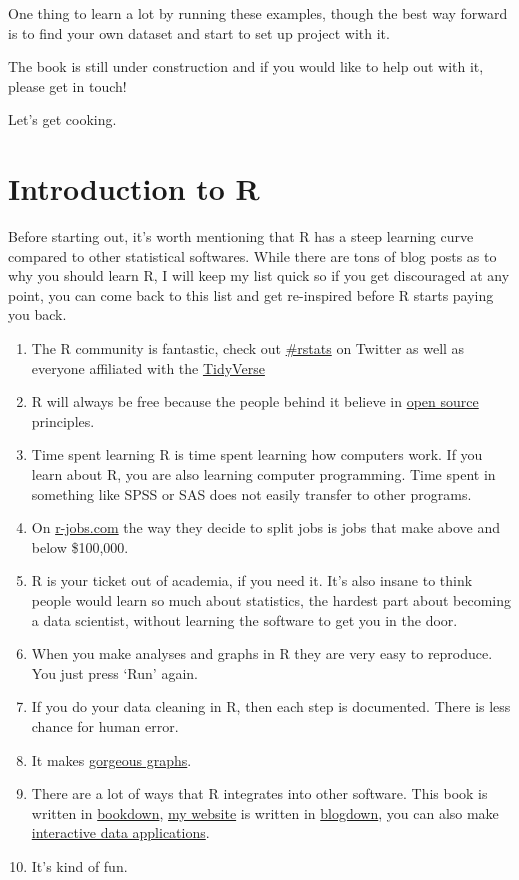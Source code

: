 \documentclass[]{book}
\providecommand{\tightlist}{%
  \setlength{\itemsep}{0pt}\setlength{\parskip}{0pt}}
\theoremstyle{definition}
\theoremstyle{definition}
\theoremstyle{definition}
\theoremstyle{remark}
\begin{document}
One thing to learn a lot by running these examples, though the best way
forward is to find your own dataset and start to set up project with it.

The book is still under construction and if you would like to help out
with it, please get in touch!

Let's get cooking.

\chapter{Introduction to R}\label{intro}

Before starting out, it's worth mentioning that R has a steep learning
curve compared to other statistical softwares. While there are tons of
blog posts as to why you should learn R, I will keep my list quick so if
you get discouraged at any point, you can come back to this list and get
re-inspired before R starts paying you back.

\begin{enumerate}
\def\labelenumi{\arabic{enumi}.}
\tightlist
\item
  The R community is fantastic, check out
  \href{https://twitter.com/search?q=\%23rstats\&src=typd}{\#rstats} on
  Twitter as well as everyone affiliated with the
  \href{https://www.tidyverse.org/}{TidyVerse}
\item
  R will always be free because the people behind it believe in
  \href{https://en.wikipedia.org/wiki/Open-source_software}{open source}
  principles.
\item
  Time spent learning R is time spent learning how computers work. If
  you learn about R, you are also learning computer programming. Time
  spent in something like SPSS or SAS does not easily transfer to other
  programs.
\item
  On \href{https://www.r-users.com/\#open}{r-jobs.com} the way they
  decide to split jobs is jobs that make above and below \$100,000.
\item
  R is your ticket out of academia, if you need it. It's also insane to
  think people would learn so much about statistics, the hardest part
  about becoming a data scientist, without learning the software to get
  you in the door.
\item
  When you make analyses and graphs in R they are very easy to
  reproduce. You just press `Run' again.
\item
  If you do your data cleaning in R, then each step is documented. There
  is less chance for human error.
\item
  It makes
  \href{http://r-statistics.co/Top50-Ggplot2-Visualizations-MasterList-R-Code.html}{gorgeous
  graphs}.
\item
  There are a lot of ways that R integrates into other software. This
  book is written in \href{https://bookdown.org/home/}{bookdown},
  \href{http://davidjohnbaker.rbind.io/}{my website} is written in
  \href{https://github.com/rstudio/blogdown}{blogdown}, you can also
  make \href{https://shiny.rstudio.com/}{interactive data applications}.
\item
  It's kind of fun.
\end{enumerate}
\end{document}
